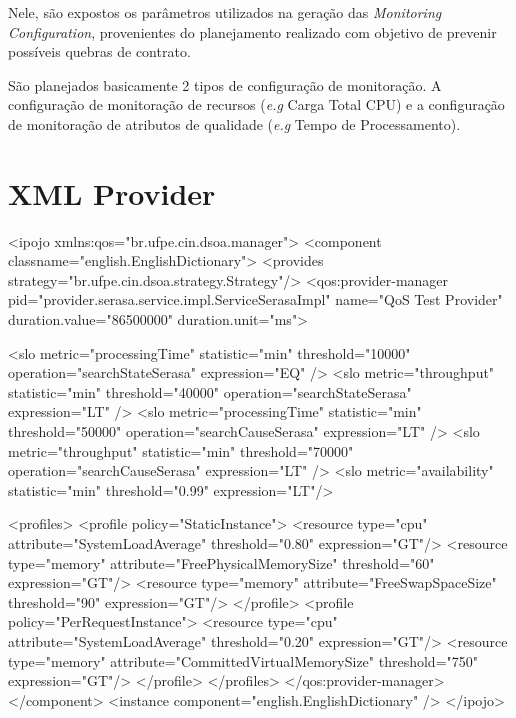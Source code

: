 Nele, são expostos os parâmetros utilizados na geração das \textit{Monitoring Configuration}, provenientes do planejamento realizado com objetivo de prevenir possíveis quebras de contrato.

São planejados basicamente 2 tipos de configuração de monitoração. A configuração de monitoração de recursos (\textit{e.g} Carga Total CPU) e a configuração de monitoração de atributos de qualidade (\textit{e.g} Tempo de Processamento).

\section{XML Provider}

\tiny
\begin{verbatimtab}[4]
<ipojo xmlns:qos="br.ufpe.cin.dsoa.manager">
	<component classname="english.EnglishDictionary">
		<provides strategy="br.ufpe.cin.dsoa.strategy.Strategy"/>
		<qos:provider-manager pid="provider.serasa.service.impl.ServiceSerasaImpl" name="QoS Test Provider"
			duration.value="86500000" duration.unit="ms">
			
			<slo metric="processingTime" statistic="min" threshold="10000"  operation="searchStateSerasa" expression="EQ" />
			<slo metric="throughput"     statistic="min" threshold="40000"  operation="searchStateSerasa" expression="LT" />
			<slo metric="processingTime" statistic="min" threshold="50000"  operation="searchCauseSerasa" expression="LT" />
			<slo metric="throughput"     statistic="min" threshold="70000"  operation="searchCauseSerasa" expression="LT" />
			<slo metric="availability"   statistic="min" threshold="0.99"   expression="LT"/>
			
			<profiles>
				<profile policy="StaticInstance">
					<resource type="cpu" 	attribute="SystemLoadAverage" threshold="0.80" expression="GT"/>
					<resource type="memory" attribute="FreePhysicalMemorySize" threshold="60" expression="GT"/>
					<resource type="memory" attribute="FreeSwapSpaceSize" threshold="90" expression="GT"/>
				</profile>
				<profile policy="PerRequestInstance">
					<resource type="cpu" 	attribute="SystemLoadAverage" threshold="0.20" expression="GT"/>
					<resource type="memory" attribute="CommittedVirtualMemorySize" threshold="750" expression="GT"/>
				</profile>
			</profiles>
		</qos:provider-manager>
	</component>
	<instance component="english.EnglishDictionary" />
</ipojo>
\end{verbatimtab}

